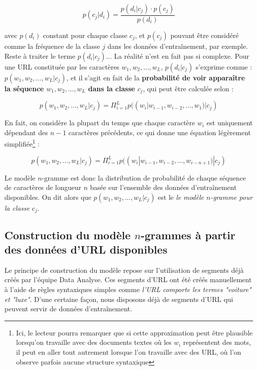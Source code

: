 \documentclass[11pt, a4paper]{article}
\begin{document}
\[
p(c_j|d_i) = \frac{p(d_i|c_j) \cdot p(c_j)}{p(d_i)}
\]

avec $p(d_i)$ constant pour chaque classe $c_j$, et $p(c_j)$ pouvant être considéré comme la fréquence de la classe $j$ dans les données d'entraînement, par exemple. Reste à traiter le terme $p(d_i|c_j)$... La réalité n'est en fait pas si complexe. Pour une URL constituée par les caractères $w_1, w_2, \dots, w_L$, $p(d_i|c_j)$ s'exprime comme : $p(w_1, w_2, \dots, w_L|c_j)$, et il s'agit en fait de la \textbf{probabilité de voir apparaître la séquence $w_1, w_2, \dots, w_L$ dans la classe $c_j$}, qui peut être calculée selon :

\[
p(w_1, w_2, \dots, w_L|c_j) = \Pi_{i=1}^{L}p((w_i|w_{i-1}, w_{i-2}, \dots, w_1)|c_j)
\]

En fait, on considère la plupart du temps que chaque caractère $w_i$ est uniquement dépendant des $n-1$ caractères précédents, ce qui donne une équation légèrement simplifiée\footnote{Ici, le lecteur pourra remarquer que si cette approximation peut être plausible lorsqu'on travaille avec des documents textes où les $w_i$ représentent des mots, il peut en aller tout autrement lorsque l'on travaille avec des URL, où l'on observe parfois aucune structure syntaxique} :

\[
p(w_1, w_2, \dots, w_L|c_j) = \Pi_{i=1}^{L}p((w_i|w_{i-1}, w_{i-2}, \dots, w_{i-n+1})|c_j)
\]

Le modèle $n$-gramme est donc la distribution de probabilité de chaque séquence de caractères de longueur $n$ basée sur l'ensemble des données d'entraînement disponibles. On dit alors que $p(w_1, w_2, \dots, w_L|c_j)$ est le \textit{le modèle $n$-gramme pour la classe $c_j$}.

\subsection{Construction du modèle $n$-grammes à partir des données d'URL disponibles}

Le principe de construction du modèle repose sur l'utilisation de segments déjà créés par l'équipe Data Analyse. Ces segments d'URL ont été créés manuellement à l'aide de règles syntaxiques simples comme \textit{l'URL comporte les termes "voiture" et "luxe"}. D'une certaine façon, nous disposons déjà de segments d'URL qui peuvent servir de données d'entraînement. 
\end{document}
